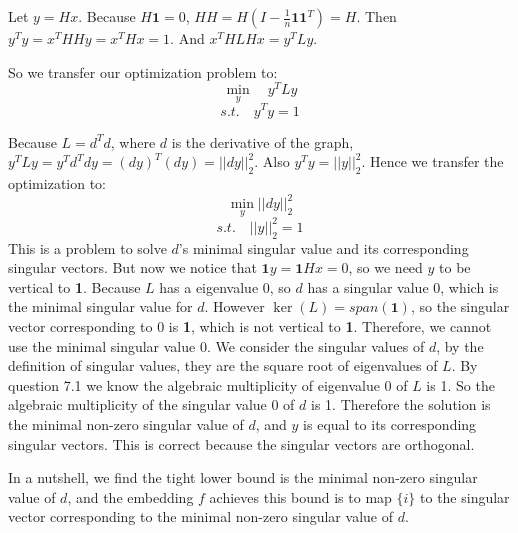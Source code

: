 \documentclass[twoside,11pt]{homework}
\begin{document}
\begin{enumerate}
    Let $y=Hx$. Because $H\textbf{1}=0$, $HH = H(I-\frac{1}{n}\textbf{1}\textbf{1}^T)=H$. Then $y^Ty = x^THHy=x^THx=1$. And $x^THLHx = y^TLy$.

    So we transfer our optimization problem to:
    $$\underset{y}{\min}\quad y^TLy$$
    $$s.t.\quad y^T y=1$$ 
    
    Because $L=d^Td$, where $d$ is the derivative of the graph, $y^TLy=y^Td^Tdy=(dy)^T(dy)=||dy||_2^2$.  Also $y^Ty=||y||_2^2$. Hence we transfer the optimization to:
    $$\underset{y}{\min}||dy||_2^2$$
    $$s.t.\quad ||y||_2^2=1$$ 
    This is a problem to solve $d$'s minimal singular value and its corresponding singular vectors. But now we notice that $\textbf{1}y = \textbf{1}Hx=0$, so we need $y$ to be vertical to \textbf{1}.
    Because $L$ has a eigenvalue 0, so $d$ has a singular value 0, which is the minimal singular value for $d$. However $\ker (L)=span(\textbf{1})$, so the singular vector corresponding to 0 is \textbf{1}, which is not vertical to \textbf{1}. Therefore, we cannot use the minimal singular value 0. We consider the singular values of $d$, by the definition of singular values, they are the square root of eigenvalues of $L$. By question 7.1 we know the  algebraic multiplicity of eigenvalue 0 of $L$ is 1. So the algebraic multiplicity of the singular value 0 of $d$ is 1. Therefore the solution is the minimal non-zero singular value of $d$, and $y$ is equal to its corresponding singular vectors. This is correct because the singular vectors are orthogonal.
    
    In a nutshell, we find the tight lower bound is the minimal non-zero singular value of $d$, and the embedding $f$ achieves this bound is to map $\{i\}$ to the singular vector corresponding to the minimal non-zero singular value of $d$. 
     

    
    
    





\end{enumerate}
\end{document}
